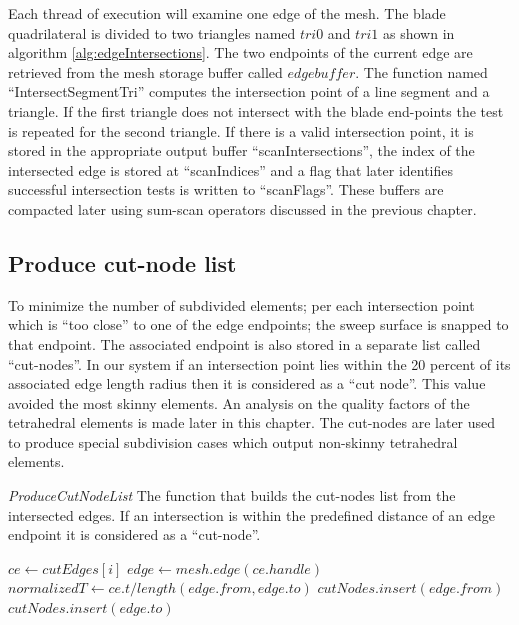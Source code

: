 Each thread of execution will examine one edge of the mesh. The blade quadrilateral is divided to two triangles named $tri0$ and $tri1$ 
as shown in algorithm \ref{alg:edgeIntersections}. The two endpoints of the current edge are retrieved from the mesh storage buffer called 
$edgebuffer$. The function named ``IntersectSegmentTri'' computes the intersection point of a line segment and a triangle. If the
first triangle does not intersect with the blade end-points the test is repeated for the second triangle. If there is a
valid intersection point, it is stored in the appropriate output buffer ``scanIntersections'', the index of the intersected edge is stored at
``scanIndices'' and a flag that later identifies successful intersection tests is written to ``scanFlags''. These buffers are compacted later 
using sum-scan operators discussed in the previous chapter. 


\subsection{Produce cut-node list}
To minimize the number of subdivided elements; per each intersection point which is ``too close'' to one of the edge endpoints; 
the sweep surface is snapped to that endpoint. The associated endpoint is also stored in a separate list called ``cut-nodes''. 
In our system if an intersection point lies within the 20 percent of its associated edge length radius then it is considered 
as a ``cut node''. This value avoided the most skinny elements. An analysis on the quality factors of the tetrahedral elements 
is made later in this chapter. The cut-nodes are later used to produce special subdivision cases which output non-skinny 
tetrahedral elements.

\begin{algorithm}[H]
\caption{\textit{ProduceCutNodeList} The function that builds the cut-nodes list from the intersected edges.
If an intersection is within the predefined distance of an edge endpoint it is considered as a ``cut-node''.}
\label{alg:produceCutNodes}
\begin{algorithmic}[1]	
  \STATE $ce \gets cutEdges\left[i\right]$
  \STATE $edge \gets mesh.edge(ce.handle)$
  \STATE $normalizedT \gets ce.t / length(edge.from, edge.to)$
  \STATE $cutNodes.insert(edge.from)$
  \ELSE
    \STATE $cutNodes.insert(edge.to)$
    \ENDIF
  \ENDIF
  \ENDFOR
\end{algorithmic}
\end{algorithm}

